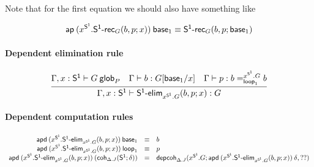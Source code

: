 Note that for the first equation we should also have something like
\begin{small}
  \[\mathsf{ap} \: {(x^{\mathsf{S^1}}.\mathsf{S^1\text{-}rec}_G(b, p; x))} \: {\mathsf{base}_{1}}
  \equiv \mathsf{S^1\text{-}rec}_G(b, p; \mathsf{base}_{1})\]
\end{small}

\paragraph{Dependent elimination rule}

\begin{small}
  \[
  \infer{\ofglob{\Gamma,x:\dsd{S^1}}{\dsd{S^1\text{-}elim}_{x^{\dsd{S^1}}.G}(b,
      p; x)}{G}} {\wfglob{\Gamma,x:\dsd{S^1}}{G}{P} &
    \ofglob{\Gamma}{b}{G[\base{1}/x]} &
    \ofglob{\Gamma}{p}{\dhomj{x^{\dsd{S^1}}.G}{b}{b}{\lp{1}}}}
  \]
\end{small}

\paragraph{Dependent computation rules}

\begin{small}
  \[
  \begin{array}{rcl}
    \mathsf{apd} \: {(x^{\mathsf{S^1}}.\mathsf{S^1\text{-}elim}_{x^{\mathsf{S^1}}.G}(b, p; x))} \: {\mathsf{base}_{1}} & \equiv & b \\
    \mathsf{apd} \: {(x^{\mathsf{S^1}}.\mathsf{S^1\text{-}elim}_{x^{\mathsf{S^1}}.G}(b, p; x))} \: {\mathsf{loop}_{1}} & \equiv & p\\
    \mathsf{apd} \: {(x^{\mathsf{S^1}}.\mathsf{S^1\text{-}elim}_{x^{\mathsf{S^1}}.G}(b, p; x))} \: {(\mathsf{coh}_{\Delta.J} ({\mathsf{S^1}};{\delta}))} & \equiv &
    \mathsf{depcoh}_{\Delta.J} ({x^{\mathsf{S^1}}.G};{\mathsf{apd} \: {(x^{\mathsf{S^1}}.\mathsf{S^1\text{-}elim}_{x^{\mathsf{S^1}}.G}(b, p; x))} \: {\delta}},{??})
    \\
  \end{array}
  \]
\end{small}


